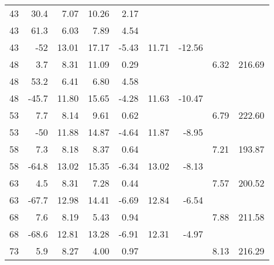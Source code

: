 \begin{table}[H]
\begin{tabular}{|r|r|r|r|r|r|r|r|r|}
            43 &       30.4 &       7.07 &      10.26 &       2.17 &            &            &            &            \\
    
            43 &       61.3 &       6.03 &       7.89 &       4.54 &            &            &            &            \\
    
            43 &        -52 &      13.01 &      17.17 &      -5.43 &      11.71 &     -12.56 &            &            \\
    \hline
            48 &        3.7 &       8.31 &      11.09 &       0.29 &            &            &       6.32 &     216.69 \\
    
            48 &       53.2 &       6.41 &       6.80 &       4.58 &            &            &            &            \\
    
            48 &      -45.7 &      11.80 &      15.65 &      -4.28 &      11.63 &     -10.47 &            &            \\
    \hline
            53 &        7.7 &       8.14 &       9.61 &       0.62 &            &            &       6.79 &     222.60 \\
    
            53 &        -50 &      11.88 &      14.87 &      -4.64 &      11.87 &      -8.95 &            &            \\
    \hline
            58 &        7.3 &       8.18 &       8.37 &       0.64 &            &            &       7.21 &     193.87 \\
    
            58 &      -64.8 &      13.02 &      15.35 &      -6.34 &      13.02 &      -8.13 &            &            \\
    \hline
            63 &        4.5 &       8.31 &       7.28 &       0.44 &            &            &       7.57 &     200.52 \\
    
            63 &      -67.7 &      12.98 &      14.41 &      -6.69 &      12.84 &      -6.54 &            &            \\
    \hline
            68 &        7.6 &       8.19 &       5.43 &       0.94 &            &            &       7.88 &     211.58 \\
    
            68 &      -68.6 &      12.81 &      13.28 &      -6.91 &      12.31 &      -4.97 &            &            \\
    \hline
            73 &        5.9 &       8.27 &       4.00 &       0.97 &            &            &       8.13 &     216.29 \\
    

\end{tabular}
\end{table}
